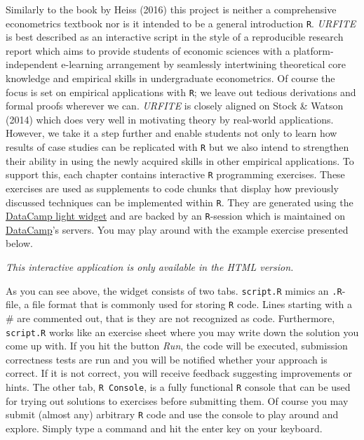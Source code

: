 \documentclass[]{book}
\theoremstyle{definition}
\theoremstyle{definition}
\theoremstyle{definition}
\theoremstyle{remark}
\begin{document}
Similarly to the book by Heiss (2016) this project is neither a
comprehensive econometrics textbook nor is it intended to be a general
introduction \texttt{R}. \emph{URFITE} is best described as an
interactive script in the style of a reproducible research report which
aims to provide students of economic sciences with a
platform-independent e-learning arrangement by seamlessly intertwining
theoretical core knowledge and empirical skills in undergraduate
econometrics. Of course the focus is set on empirical applications with
\texttt{R}; we leave out tedious derivations and formal proofs wherever
we can. \emph{URFITE} is closely aligned on Stock \& Watson (2014) which
does very well in motivating theory by real-world applications. However,
we take it a step further and enable students not only to learn how
results of case studies can be replicated with \texttt{R} but we also
intend to strengthen their ability in using the newly acquired skills in
other empirical applications. To support this, each chapter contains
interactive \texttt{R} programming exercises. These exercises are used
as supplements to code chunks that display how previously discussed
techniques can be implemented within \texttt{R}. They are generated
using the \href{https://github.com/datacamp/datacamp-light}{DataCamp
light widget} and are backed by an \texttt{R}-session which is
maintained on \href{https://www.datacamp.com/home}{DataCamp}'s servers.
You may play around with the example exercise presented below.

\begin{center}\textit{This interactive application is only available in the HTML version.}\end{center}

As you can see above, the widget consists of two tabs. \texttt{script.R}
mimics an \texttt{.R}-file, a file format that is commonly used for
storing \texttt{R} code. Lines starting with a \# are commented out,
that is they are not recognized as code. Furthermore, \texttt{script.R}
works like an exercise sheet where you may write down the solution you
come up with. If you hit the button \emph{Run}, the code will be
executed, submission correctness tests are run and you will be notified
whether your approach is correct. If it is not correct, you will receive
feedback suggesting improvements or hints. The other tab,
\texttt{R Console}, is a fully functional \texttt{R} console that can be
used for trying out solutions to exercises before submitting them. Of
course you may submit (almost any) arbitrary \texttt{R} code and use the
console to play around and explore. Simply type a command and hit the
enter key on your keyboard.
\end{document}
